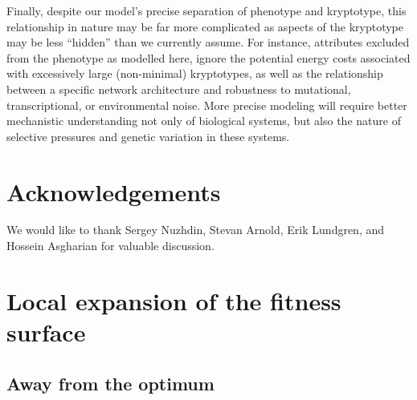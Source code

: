 \documentclass{article}
\newcommand{\plr}[1]{\todo[color=blue!25]{#1}}
\newcommand{\plr}[1]{{\color{blue}\it #1}}
\newcommand{\1}{\mathbbm{1}}
\begin{document}
Finally, despite our model's precise separation of phenotype and kryptotype, this relationship in nature may be far more complicated as aspects of the kryptotype may be less ``hidden'' than we currently assume. For instance, attributes excluded from the phenotype as modelled here, ignore the potential energy costs associated with excessively large (non-minimal) kryptotypes, as well as the relationship between a specific network architecture and robustness to mutational, transcriptional, or environmental noise.
More precise modeling will require better mechanistic understanding not only of biological systems,
but also the nature of selective pressures
and genetic variation in these systems.

%

\section*{Acknowledgements}
We would like to thank Sergey Nuzhdin, Stevan Arnold, Erik Lundgren, and Hossein Asgharian for valuable discussion.
%




\normalsize
\appendix


\section{Local expansion of the fitness surface}


\subsection{Away from the optimum}
\label{apx:away_from_opt}
\end{document}

